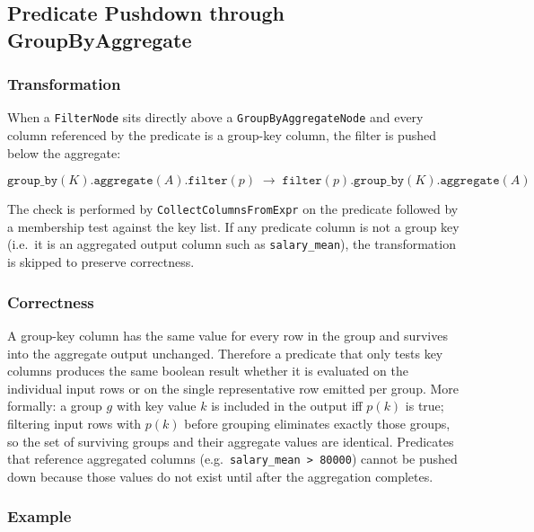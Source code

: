 \documentclass[12pt,a4paper]{article}
\begin{document}
\subsection{Predicate Pushdown through GroupByAggregate}

\subsubsection*{Transformation}

When a \texttt{FilterNode} sits directly above a
\texttt{GroupByAggregateNode} and every column referenced by the predicate
is a group-key column, the filter is pushed below the aggregate:

\[
\texttt{group\_by}(K)\texttt{.aggregate}(A)\texttt{.filter}(p)
\;\longrightarrow\;
\texttt{filter}(p)\texttt{.group\_by}(K)\texttt{.aggregate}(A)
\]

The check is performed by \texttt{CollectColumnsFromExpr} on the predicate
followed by a membership test against the key list.  If any predicate
column is not a group key (i.e.\ it is an aggregated output column such as
\texttt{salary\_mean}), the transformation is skipped to preserve
correctness.

\subsubsection*{Correctness}

A group-key column has the same value for every row in the group and
survives into the aggregate output unchanged.  Therefore a predicate that
only tests key columns produces the same boolean result whether it is
evaluated on the individual input rows or on the single representative row
emitted per group.  More formally: a group $g$ with key value $k$ is
included in the output iff $p(k)$ is true; filtering input rows with $p(k)$
before grouping eliminates exactly those groups, so the set of surviving
groups and their aggregate values are identical.  Predicates that reference
aggregated columns (e.g.\ \texttt{salary\_mean > 80000}) cannot be pushed
down because those values do not exist until after the aggregation
completes.

\subsubsection*{Example}
\end{document}
